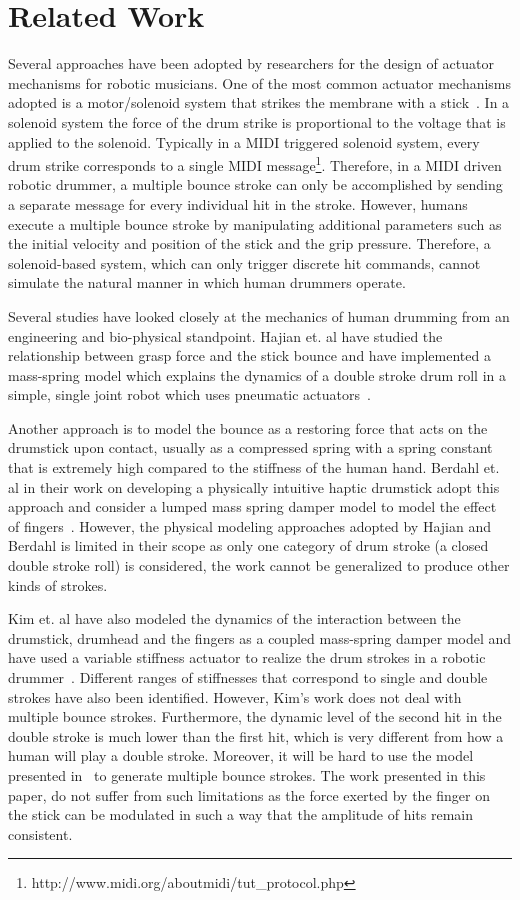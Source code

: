 \documentclass[final,1p,times]{elsarticle}
\begin{document}
\section{Related Work}	
Several approaches have been adopted by researchers for the design of actuator mechanisms for robotic musicians. One of the most common actuator
mechanisms adopted is a motor/solenoid system that strikes the membrane
with a stick~\cite{kapur2007comparison}. In a solenoid system the force of the drum strike is proportional to the voltage that is applied to the solenoid. Typically in a MIDI triggered solenoid system, every drum strike corresponds to a single MIDI message\footnote{http://www.midi.org/aboutmidi/tut\_protocol.php}. Therefore, in a MIDI driven robotic drummer, a multiple bounce stroke can only be accomplished by sending a separate message for every individual hit in the stroke. However, humans execute a multiple bounce stroke by manipulating additional parameters such as the initial velocity and position of the stick and the grip pressure. Therefore, a solenoid-based system, which can only trigger discrete hit commands, cannot simulate the natural manner in which human drummers operate.

Several studies have looked closely at the mechanics of human drumming
from an engineering and bio-physical standpoint. Hajian et. al have studied the relationship between grasp force and the stick bounce and have implemented a mass-spring model which explains the dynamics of a double stroke drum roll in a simple, single joint robot which uses pneumatic actuators~\cite{hajian1997drum}.

Another approach is to model the bounce as a restoring force that acts
on the drumstick upon contact, usually as a compressed spring with a spring
constant that is extremely high compared to the stiffness of the human hand.
Berdahl et. al in their work on developing a physically intuitive haptic drumstick adopt this approach and consider a lumped mass spring damper model to model the effect of fingers~\cite{berdahl2007physically}. However, the physical modeling approaches adopted by Hajian and Berdahl is
limited in their scope as only one category of drum stroke (a closed double stroke roll) is considered, the work cannot be generalized to produce other kinds of strokes.

Kim et. al have also modeled the dynamics of the interaction between the drumstick, drumhead and the fingers as a coupled mass-spring damper model and have used a variable stiffness actuator to realize the drum strokes in a robotic drummer~\cite{kim2014drum}. Different ranges of stiffnesses that correspond to single and double strokes have also been identified. However, Kim's work does not deal with multiple bounce strokes. Furthermore, the dynamic level of the second hit in the double stroke is much lower than the first hit, which is very different from how a human will play a double stroke. Moreover, it will be hard to use the model presented in~\cite{kim2014drum} to generate multiple bounce strokes. The work presented in this paper, do not suffer from such limitations as the force exerted by the finger on the stick can be modulated in such a way that the amplitude of hits remain consistent. 	
\end{document}
